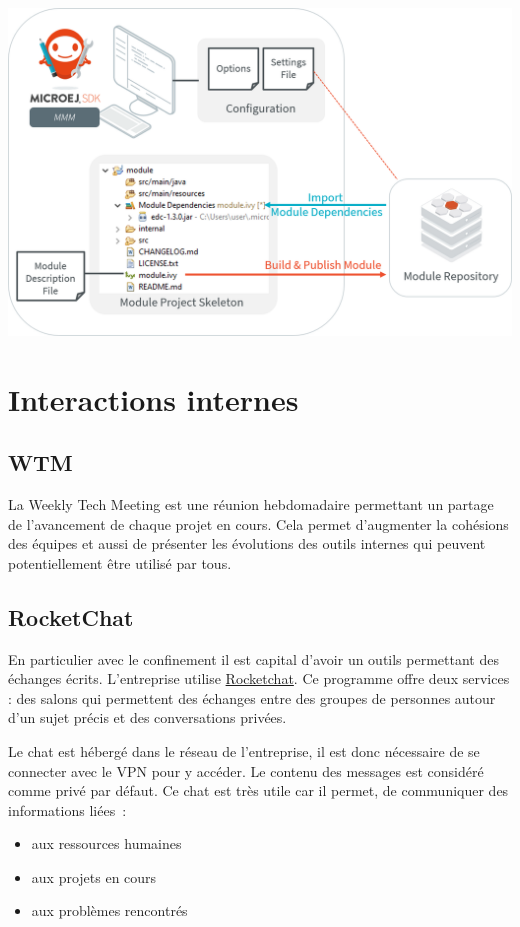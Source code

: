 \documentclass[french,a4paper,12pt]{report}
\begin{document}
\begin{center}
\includegraphics[width=.8\textwidth]{./ressources/schemas/mmm_flow.png}
\end{center}

\section{Interactions internes}

\subsection{WTM}

La Weekly Tech Meeting est une réunion hebdomadaire permettant un partage de l’avancement de chaque projet en cours. Cela permet d'augmenter la cohésions des équipes et aussi de présenter les évolutions des outils internes qui peuvent potentiellement être utilisé par tous.

\subsection{RocketChat}

En particulier avec le confinement il est capital d’avoir un outils permettant des échanges écrits. L'entreprise utilise \href{https://rocket.chat/}{Rocketchat}. Ce programme offre deux services : des salons qui permettent des échanges entre des groupes de personnes autour d'un sujet précis et des conversations privées.

Le chat est hébergé dans le réseau de l’entreprise, il est donc nécessaire de se connecter avec le VPN pour y accéder. Le contenu des messages est considéré comme privé par défaut.
Ce chat est très utile car il permet, de communiquer des informations liées :

\begin{itemize}
\setcounter{enumi}{-1}
\item aux ressources humaines
\item aux projets en cours
\item aux problèmes rencontrés
\end{itemize}
\end{document}

